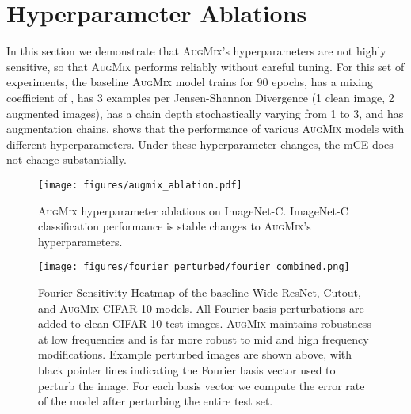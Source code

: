 \documentclass{article} \usepackage{iclr2020_conference,times}
\begin{document}
\section{Hyperparameter Ablations}\label{app:moreablations}
In this section we demonstrate that \textsc{AugMix}'s hyperparameters are not highly sensitive, so that \textsc{AugMix} performs reliably without careful tuning. For this set of experiments, the baseline \textsc{AugMix} model trains for 90 epochs, has a mixing coefficient of , has 3 examples per Jensen-Shannon Divergence (1 clean image, 2 augmented images), has a chain depth stochastically varying from 1 to 3, and has  augmentation chains.  shows that the performance of various \textsc{AugMix} models with different hyperparameters. Under these hyperparameter changes, the mCE does not change substantially.

\begin{figure}[ht]
\centering
\texttt{[image: figures/augmix\_ablation.pdf]}
\caption{
\textsc{AugMix} hyperparameter ablations on ImageNet-C. ImageNet-C classification performance is stable changes to \textsc{AugMix}'s hyperparameters.
}\label{fig:moreablations}
\end{figure}
















\begin{figure}[ht]
\centering
\texttt{[image: figures/fourier\_perturbed/fourier\_combined.png]}
\caption{
Fourier Sensitivity Heatmap of the baseline Wide ResNet, Cutout, and \textsc{AugMix} CIFAR-10 models. All Fourier basis perturbations are added to clean CIFAR-10 test images. \textsc{AugMix}  maintains robustness at low frequencies and is far more robust to mid and high frequency modifications. Example perturbed images are shown above, with black pointer lines indicating the Fourier basis vector used to perturb the image. For each basis vector we compute the error rate of the model after perturbing the entire test set.
}\label{fig:fourier}
\vspace{-5pt}
\end{figure}
\end{document}

